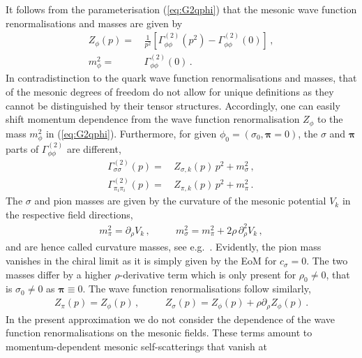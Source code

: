 \documentclass[%
reprint,
superscriptaddress,
showpacs,preprintnumbers,
 amsmath,amssymb,
 aps,
prd,
]{revtex4-1}
\def\eq#1{(\ref{#1})}
\begin{document}
It follows from the parameterisation \eq{eq:G2qphi} that the mesonic
wave function renormalisations and masses are given by
%
\begin{align}\nonumber 
  Z_\phi(p) =&\, \frac{1}{p^2}\left[ \Gamma_{\phi\phi}^{(2)}(p^2) -
                 \Gamma_{\phi\phi}^{(2)}(0 ) \right]\,,\\[1ex]
  m_\phi^2 = &\,\Gamma_{\phi\phi}^{(2)}(0)\,.
\label{eq:ZphiMphi}
\end{align}
%
In contradistinction to the quark wave function renormalisations and
masses, that of the mesonic degrees of freedom do not allow for unique
definitions as they cannot be distinguished by their tensor
structures. Accordingly, one can easily shift momentum dependence from
the wave function renormalisation $Z_\phi$ to the mass $m_\phi^2$ in
\eq{eq:G2qphi}. Furthermore, for given
$\phi_0 = (\sigma_0 ,\bm \pi=0)$, the $\sigma$ and $\bm \pi$ parts of
$\Gamma^{(2)}_{\phi\phi}$ are different,
%
\begin{align}\nonumber 
  \Gamma^{(2)}_{\sigma\sigma}(p) =&\, Z_{\sigma,k}(p)\,p^2 + m_\sigma^2
                                    \,, \\[1ex]
  \Gamma^{(2)}_{\pi_i\pi_i}(p) =&\, Z_{\pi,k}(p)\,p^2 + m_\pi^2\,. 
                                 \label{eq:sigmapi2}
\end{align}
%
The $\sigma$ and pion masses are given by the curvature of the mesonic
potential $V_k$ in the respective field directions,
%
\begin{align}
  m_\pi^2 =  \partial_\rho V_k \,, &\quad & m_\sigma^2 =  m_\pi^2 +
                                         2 \rho\,\partial_\rho^2 V_k\,,
\label{eq:MesonicM}
\end{align}
%
and are hence called curvature masses, see e.g.\
\cite{Helmboldt:2014iya}. Evidently, the pion mass vanishes in the
chiral limit as it is simply given by the EoM for $c_\sigma = 0$. The
two masses differ by a higher $\rho$-derivative term which is only
present for $\rho_0\neq 0$, that is $\sigma_0\neq 0$ as
  $\bm\pi\equiv 0$. The wave function renormalisations follow
similarly,
%
\begin{align}
  Z_{\pi}(p) =Z_\phi(p) \,,& \quad& Z_{\sigma}(p) =  Z_\phi(p)
                                          +\rho\partial_\rho Z_\phi(p)\,.
\label{eq:MesonicZ}\end{align}
%
In the present approximation we do not consider the dependence of the
wave function renormalisations on the mesonic fields. These terms
amount to momentum-dependent mesonic self-scatterings that vanish at
\end{document}
